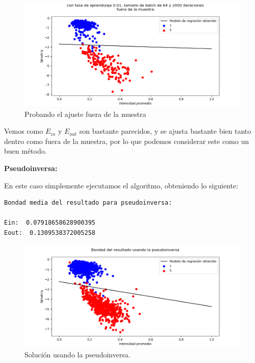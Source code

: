 \documentclass[12pt, spanish]{article}
\begin{document}
\begin{figure}[H]
  \centering
      \includegraphics[scale = 0.70]{ej2-1-sgd-out.png}
 		 \caption{Probando el ajuste fuera de la muestra}
  		\label{fig:ej2-1-sgd}

\end{figure}


Vemos como $E_{in}$ y $E_{out}$ son bastante parecidos, y se ajusta bastante bien tanto dentro como fuera de la muestra, por lo que podemos considerar este como un buen método.


\vspace{2cm}

\textbf{Pseudoinversa:}

En este caso simplemente ejecutamos el algoritmo, obteniendo lo siguiente:



\begin{lstlisting}
Bondad media del resultado para pseudoinversa:

Ein:  0.07918658628900395
Eout:  0.1309538372005258
\end{lstlisting}


\begin{figure}[H]
  \centering
      \includegraphics[scale = 0.70]{ej2-1-pseudo.png}
 		 \caption{Solución usando la pseudoinversa.}
  		\label{fig:ej2-1-pseudo}

\end{figure}
\end{document}

